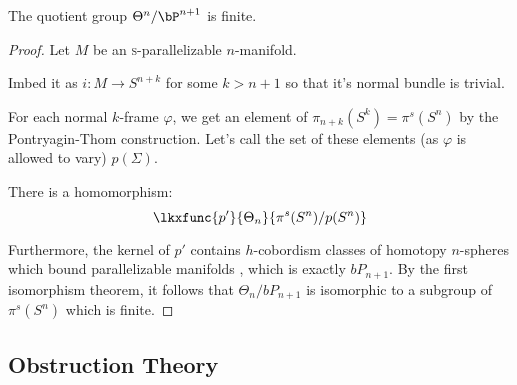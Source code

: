 \begin{theorem}\label{thm:finite-very-exotic-spheres}
	The quotient group $\Theta^n / \bP^{n+1}$ is finite.
\end{theorem}
\begin{proof}
	Let $M$ be an \textsc{s}-parallelizable $n$-manifold.

	Imbed it as $i : M \to S^{n+k}$ for some $k>n+1$ so that it's normal bundle is trivial.

	For each normal $k$-frame $\varphi$, we get an element of $\pi_{n+k}(S^k) = \pi^s(S^n)$ by the Pontryagin-Thom construction. Let's call the set of these elements (as $\varphi$ is allowed to vary) $p(\Sigma)$. 


	\begin{lemma}
		There is a homomorphism:
		\[
			\lkxfunc{p'}{\Theta_n}{\pi^s(S^n)/p(S^n)}
		\]
	\end{lemma}

	Furthermore, the kernel of $p'$ contains $h$-cobordism classes of homotopy $n$-spheres which bound parallelizable manifolds , which is exactly $bP_{n+1}$. By the first isomorphism theorem, it follows that $\Theta_n/bP_{n+1}$ is isomorphic to a subgroup of $\pi^s(S^n)$ which is finite.
\end{proof}

\subsection{Obstruction Theory}\label{sec:obstruction-theory}

